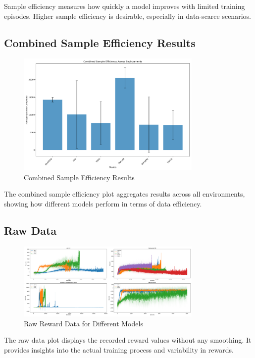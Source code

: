 \documentclass{svproc}
\begin{document}
Sample efficiency measures how quickly a model improves with limited training episodes. Higher sample efficiency is desirable, especially in data-scarce scenarios.

\subsection{Combined Sample Efficiency Results}

\begin{figure}[H]
    \centering
    \includegraphics[width=0.8\textwidth]{.assets/sample_efficiency_combined.png}
    \caption{Combined Sample Efficiency Results}
\end{figure}

The combined sample efficiency plot aggregates results across all environments, showing how different models perform in terms of data efficiency.

\subsection{Raw Data}

\begin{figure}[H]
    \centering
    \includegraphics[width=0.8\textwidth]{.assets/raw_data.png}
    \caption{Raw Reward Data for Different Models}
\end{figure}

The raw data plot displays the recorded reward values without any smoothing. It provides insights into the actual training process and variability in rewards.
\end{document}
